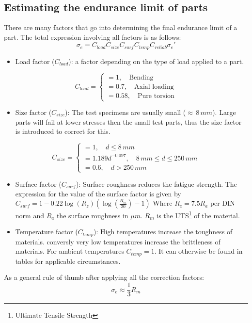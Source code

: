 \documentclass[11pt, a4paper]{article}
\begin{document}
\subsection{Estimating the endurance limit of parts}
There are many factors that go into determining the final endurance limit of a part. The total expression involving all factors is as follows:
\begin{equation}
  \sigma_e = C_{load}C_{size}C_{surf}C_{temp}C_{reliab}\sigma_e'
\end{equation}
\begin{itemize}
\item Load factor ($C_{load}$): a factor depending on the type of load applied to a part.
\end{itemize}
\begin{equation}
  C_{load} = \begin{cases}
    = 1,\quad \text{Bending}\\
    = 0.7,\quad \text{Axial loading}\\
    = 0.58,\quad \text{Pure torsion}
  \end{cases}
\end{equation}
\begin{itemize}
  \item Size factor ($C_{size}$): The test specimens are usually small ($\approx\,8\,mm$). Large parts will fail at lower stresses then the small test parts, thus the size factor is introduced to correct for this. 
\end{itemize}
\begin{equation}
  C_{size} = \begin{cases}
    = 1,\quad d \leq 8\,mm\\
    = 1.189d^{-0.097},\quad 8\,mm \leq d \leq 250\,mm\\
    = 0.6,\quad d > 250\,mm
  \end{cases}
\end{equation}
\begin{itemize}
  \item Surface factor ($C_{surf}$): Surface roughness reduces the fatigue strength. The expression for the value of the surface factor is given by $C_{surf} = 1 - 0.22\log(R_z)\left(\log\left(\frac{R_m}{20}\right) - 1 \right)$ Where $R_z = 7.5R_a$ per DIN norm and $R_a$ the surface roughness in $\mu m$. $R_m$ is the UTS\footnote{Ultimate Tensile Strength} of the material.
  \item Temperature factor ($C_{temp}$): High temperatures increase the toughness of materials. conversly very low temperatures increase the brittleness of materials. For ambient temperatures $C_{temp} = 1$. It can otherwise be found in tables for applicable circumstances.
\end{itemize}
As a general rule of thumb after applying all the correction factors:
\begin{equation}
  \sigma_e \approx \frac{1}{3}R_m
\end{equation}
\end{document}
